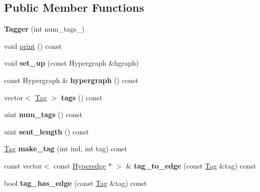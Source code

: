 \subsection*{Public Member Functions}
\begin{DoxyCompactItemize}
\item 
\hypertarget{classTagger_a6e812fd7e339a21155f7b30f04292be1}{
{\bfseries Tagger} (int num\_\-tags\_\-)}
\label{classTagger_a6e812fd7e339a21155f7b30f04292be1}

\item 
void \hyperlink{classTagger_a4ebe0aebd7c0392970b401a5a6c6cd72}{print} () const 
\item 
\hypertarget{classTagger_afafa6e435d17467db344ca615f24746f}{
void {\bfseries set\_\-up} (const Hypergraph \&hgraph)}
\label{classTagger_afafa6e435d17467db344ca615f24746f}

\item 
\hypertarget{classTagger_ad694ed218149b86c4ef5253328a41c49}{
const Hypergraph \& {\bfseries hypergraph} () const }
\label{classTagger_ad694ed218149b86c4ef5253328a41c49}

\item 
\hypertarget{classTagger_ae1e3802fb545c3430ca4d52ea5fd95db}{
vector$<$ \hyperlink{structTag}{Tag} $>$ {\bfseries tags} () const }
\label{classTagger_ae1e3802fb545c3430ca4d52ea5fd95db}

\item 
\hypertarget{classTagger_a5da221998377bf36c84013ba0d471b36}{
uint {\bfseries num\_\-tags} () const }
\label{classTagger_a5da221998377bf36c84013ba0d471b36}

\item 
\hypertarget{classTagger_ae762dd21f446b9ec618b0b83204bdc2e}{
uint {\bfseries sent\_\-length} () const }
\label{classTagger_ae762dd21f446b9ec618b0b83204bdc2e}

\item 
\hypertarget{classTagger_af01daf511528271a118a281b8595e0df}{
\hyperlink{structTag}{Tag} {\bfseries make\_\-tag} (int ind, int tag) const }
\label{classTagger_af01daf511528271a118a281b8595e0df}

\item 
\hypertarget{classTagger_a26472c386e7f5eebcb05c9d1843c1975}{
const vector$<$ const \hyperlink{classScarab_1_1HG_1_1Hyperedge}{Hyperedge} $\ast$ $>$ \& {\bfseries tag\_\-to\_\-edge} (const \hyperlink{structTag}{Tag} \&tag) const }
\label{classTagger_a26472c386e7f5eebcb05c9d1843c1975}

\item 
\hypertarget{classTagger_ae270a5be64b93945c180996aedcf6372}{
bool {\bfseries tag\_\-has\_\-edge} (const \hyperlink{structTag}{Tag} \&tag) const }
\label{classTagger_ae270a5be64b93945c180996aedcf6372}


\end{DoxyCompactItemize}
